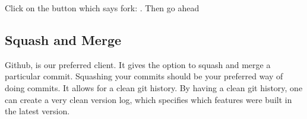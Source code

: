 Click on the button which says fork: .
Then go ahead



\subsection { Squash and Merge }
Github, is our preferred client. It gives the option to squash and merge a
particular commit. Squashing your commits should be your preferred way of doing
commits. It allows for a clean git history. By having a clean git history, one
can create a very clean version log, which specifies which features were built
in the latest version.
